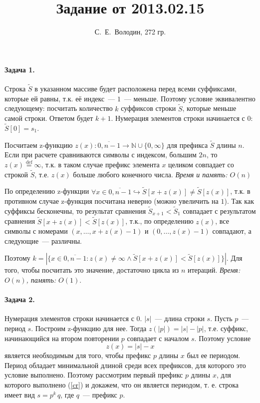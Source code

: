 \documentclass{article}
\title{Задание от 2013.02.15}
\author{С.~Е.~Володин, 272 гр.}
\date{}
\begin{document}
\maketitle
\paragraph{Задача 1.} Строка $\tilde{S}$ в указанном массиве будет расположена перед всеми суффиксами, которые ей равны, т.к. её индекс~--- $1$~--- меньше. Поэтому условие эквивалентно следующему: посчитать количество $k$ суффиксов строки $\tilde{S}$, которые меньше самой строки. Ответом будет $k+1$. Нумерация элементов строки начинается с $0$: $\tilde{S}[0]=s_1$.

Посчитаем z-функцию \begin{math}z(x):\overline{0,n-1}\rightarrow\mathbb{N}\cup\{0,\infty\}\end{math} для префикса $\tilde{S}$ длины $n$. Если при расчете сравниваются символы с индексом, большим $2n$, то $z(x)\stackrel{\mathrm{def}}{=}\infty$, т.к. в таком случае префикс элемента $x$ целиком совпадает со строкой $\tilde{S}$, т.е.  $z(x)$ больше любого конечного числа. {\em Время и память: $O(n)$}

По определению z-функции $\forall x\in\overline{0,n-1}\hookrightarrow\tilde{S}[x+z(x)]\neq\tilde{S}[z(x)]$, т.к. в противном случае z-функция посчитана неверно (можно увеличить на $1$). Так как суффиксы бесконечны, то результат сравнения $\tilde{S}_{x+1}<\tilde{S}_1$ совпадает с результатом сравнения $\tilde{S}[x+z(x)]<\tilde{S}[z(x)]$, т.к., по определению $z(x)$, все символы с номерами $(x,\dots,x+z(x)-1)$ и $(0,\dots,z(x)-1)$ совпадают, а следующие~--- различны.

Поэтому $k=|\{x\in\overline{0,n-1}:z(x)\neq\infty\wedge\tilde{S}[x+z(x)]<\tilde{S}[z(x)]\}|$. Для того, чтобы посчитать это значение, достаточно цикла из $n$ итераций. {\em Время: $O(n)$, память: $O(1)$}.
\paragraph{Задача 2.} Нумерация элементов строки начинается с $0$. $|s|$~--- длина строки $s$. Пусть $p$~--- период $s$. Построим z-функцию для нее. Тогда $z(|p|)=|s|-|p|$, т.е. суффикс, начинающийся на втором повторении $p$ совпадает с началом $s$.
Поэтому условие \begin{equation}\label{cr}z(x)=|s|-x\end{equation} является необходимым для того, чтобы префикс $p$ длины $x$ был ее периодом. Период обладает минимальной длиной среди всех префиксов, для которого это условие выполнено. Поэтому рассмотрим первый префикс $p$ длины $x$, для которого выполнено (\ref{cr}) и докажем, что он является периодом, т. е. строка имеет вид $s=p^k\,q$, где $q$~--- префикс $p$.
\end{document}
